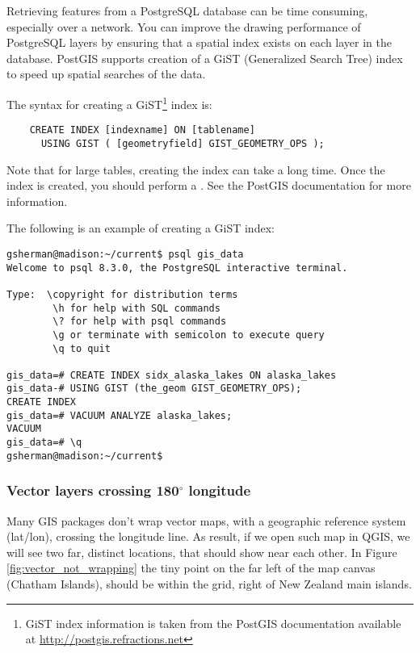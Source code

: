 Retrieving features from a PostgreSQL database can be time consuming,
especially over a network. You can improve the drawing performance of
PostgreSQL layers by ensuring that a  spatial
index
exists on each layer in the database. PostGIS supports creation of a
 GiST
(Generalized Search Tree) index to speed up spatial searches of the data.

The syntax for creating a GiST\footnote{GiST index information is taken from the PostGIS
documentation available at \url{http://postgis.refractions.net}}
index is:

\begin{verbatim}
    CREATE INDEX [indexname] ON [tablename] 
      USING GIST ( [geometryfield] GIST_GEOMETRY_OPS );
\end{verbatim}

Note that for large tables, creating the index can take a long time. Once the
index is created, you should perform a . See the
PostGIS documentation \cite{PostGISweb} for more information.

The following is an example of creating a GiST index:
\begin{verbatim}
gsherman@madison:~/current$ psql gis_data
Welcome to psql 8.3.0, the PostgreSQL interactive terminal.

Type:  \copyright for distribution terms
        \h for help with SQL commands
        \? for help with psql commands
        \g or terminate with semicolon to execute query
        \q to quit

gis_data=# CREATE INDEX sidx_alaska_lakes ON alaska_lakes
gis_data-# USING GIST (the_geom GIST_GEOMETRY_OPS);
CREATE INDEX
gis_data=# VACUUM ANALYZE alaska_lakes;
VACUUM
gis_data=# \q
gsherman@madison:~/current$
\end{verbatim}

\subsubsection{Vector layers crossing 180$^\circ$ longitude}

Many GIS packages don't wrap vector maps, with a geographic reference system
(lat/lon), crossing the  longitude line. As result, if
we open such map in QGIS, we will see two far, distinct locations, that
should show near each other. In Figure \ref{fig:vector_not_wrapping} the tiny
point on the far left of the map canvas (Chatham Islands), should be within
the grid, right of New Zealand main islands.

